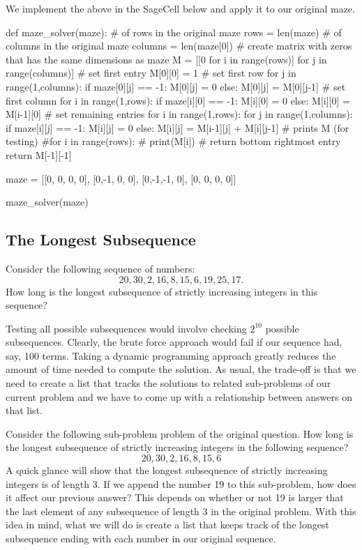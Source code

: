\documentclass{ximera}
\begin{document}
We implement the above in the SageCell below and apply it to our original maze.
\begin{sageCell}
def maze_solver(maze):
        # of rows in the original maze
        rows = len(maze)
        # of columns in the original maze
        columns = len(maze[0])
        # create matrix with zeros that has the same dimensions as maze
        M = [[0 for i in range(rows)] for j in range(columns)]
        # set first entry
        M[0][0] = 1
        # set first row
        for j in range(1,columns):
                if maze[0][j] == -1:
                        M[0][j] = 0
                else:
                        M[0][j] = M[0][j-1]
        # set first column
        for i in range(1,rows):
                if maze[i][0] == -1:
                        M[i][0] = 0
                else:
                        M[i][0] = M[i-1][0]
        # set remaining entries
        for i in range(1,rows):
                for j in range(1,columns):
                        if maze[i][j] == -1:
                                M[i][j] = 0
                        else:
                                M[i][j] = M[i-1][j] + M[i][j-1]
        # prints M (for testing)
        #for i in range(rows):
        #    print(M[i])
        # return bottom rightmost entry
        return M[-1][-1]

maze = [[0, 0, 0, 0],
        [0,-1, 0, 0],
        [0,-1,-1, 0],
        [0, 0, 0, 0]]

maze_solver(maze)
\end{sageCell}

\subsection{The Longest Subsequence}

Consider the following sequence of numbers: $$20,30,2,16,8,15,6,19,25,17.$$ How long is the longest subsequence of strictly increasing integers in this sequence?

Testing all possible subsequences would involve checking $2^{10}$ possible subsequences. Clearly, the brute force approach would fail if our sequence had, say, 100 terms. Taking a dynamic programming approach greatly reduces the amount of time needed to compute the solution. As usual, the trade-off is that we need to create a list that tracks the solutions to related sub-problems of our current problem and we have to come up with a relationship between answers on that list.

Consider the following sub-problem problem of the original question. How long is the longest subsequence of strictly increasing integers in the following sequence? $$20,30,2,16,8,15,6$$ A quick glance will show that the longest subsequence of strictly increasing integers is of length 3. If we append the number 19 to this sub-problem, how does it affect our previous answer? This depends on whether or not 19 is larger that the last element of any subsequence of length 3 in the original problem. With this idea in mind, what we will do is create a list that keeps track of the longest subsequence ending with each number in our original sequence. 
\end{document}
